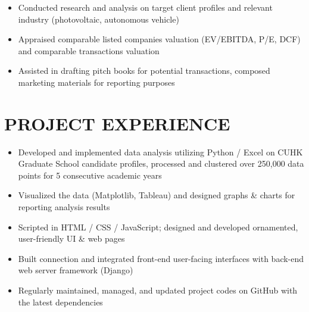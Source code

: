 \documentclass[classic]{resume}
\begin{document}
    \begin{itemize}
        \item Conducted research and analysis on target client profiles and relevant industry (photovoltaic, autonomous vehicle)
        \item Appraised comparable listed companies valuation (EV/EBITDA, P/E, DCF) and comparable transactions valuation
        \item Assisted in drafting pitch books for potential transactions, composed marketing materials for reporting purposes
    \end{itemize}
    \section{PROJECT EXPERIENCE}
    \begin{itemize}
        \item Developed and implemented data analysis utilizing  Python / Excel on CUHK Graduate School candidate profiles, processed and clustered over 250,000 data points for 5 consecutive academic years
        \item Visualized the data (Matplotlib, Tableau) and designed graphs \& charts for reporting analysis results
    \end{itemize}
    \begin{itemize}
        \item Scripted in HTML / CSS / JavaScript; designed and developed ornamented, user-friendly UI \& web pages
        \item Built connection and integrated front-end user-facing interfaces with back-end web server framework (Django)
        \item Regularly maintained, managed, and updated project codes on GitHub with the latest dependencies
    \end{itemize}
\end{document}
